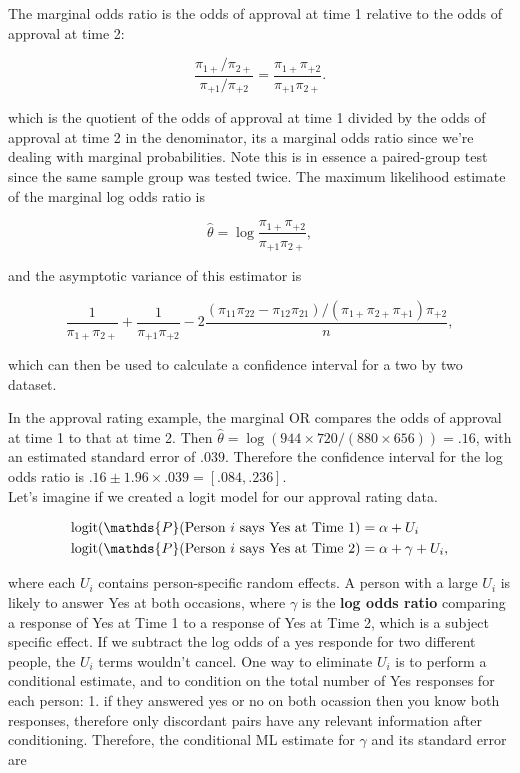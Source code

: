 \documentclass{homework}
\begin{document}
The marginal odds ratio is the odds of approval at time 1 relative to the odds of approval at time 2:

$$
\frac{\pi_{1+}/\pi_{2+}}{\pi_{+1}/\pi_{+2}} = \frac{\pi_{1+}\pi_{+2}}{\pi_{+1}\pi_{2+}}.
$$

which is the quotient of the odds of approval at time 1 divided by the odds of approval at time 2 in the denominator, its a marginal odds ratio since we're dealing with marginal probabilities. Note this is in essence a paired-group test since the same sample group was tested twice. 
The maximum likelihood estimate of the marginal log odds ratio is 

$$
\hat{\theta} = \log \frac{\pi_{1+}\pi_{+2}}{\pi_{+1}\pi_{2+}},
$$

and the asymptotic variance of this estimator is 

$$
\frac{1}{\pi_{1+}\pi_{2+}} + \frac{1}{\pi_{+1}\pi_{+2}} - 2\frac{(\pi_{11}\pi_{22}-\pi_{12}\pi_{21})/(\pi_{1+}\pi_{2+}\pi_{+1})\pi_{+2}}{n},
$$

which can then be used to calculate a confidence interval for a two by two dataset. 

In the approval rating example, the marginal OR compares the odds of approval at time 1 to that at time 2. Then $\hat{\theta}= \log(944\times 720/(880\times656)) = .16$, with an estimated standard error of $.039$. Therefore the confidence interval for the log odds ratio is $.16 \pm 1.96 \times .039 = [.084, .236]$. \\

Let's imagine if we created a logit model for our approval rating data. 

\begin{align*}
   & \textnormal{logit}(\mathds{P}(\textnormal{Person } i \textnormal{ says Yes at Time 1}) = \alpha + U_i \\
    & \textnormal{logit}(\mathds{P}(\textnormal{Person } i \textnormal{ says Yes at Time 2}) = \alpha + \gamma + U_i,
\end{align*}

where each $U_i$ contains person-specific random effects. A person with a large $U_i$ is likely to answer Yes at both occasions, where $\gamma$ is the \textbf{log odds ratio} comparing a response of Yes at Time 1 to a response of Yes at Time 2, which is a subject specific effect. If we subtract the log odds of a yes responde for two different people, the $U_i$ terms wouldn't cancel. One way to eliminate $U_i$ is to perform a conditional estimate, and to condition on the total number of Yes responses for each person: 1. if they answered yes or no on both ocassion then you know both responses, therefore only discordant pairs have any relevant information after conditioning. Therefore, the conditional ML estimate for $\gamma$ and its standard error are
\end{document}
